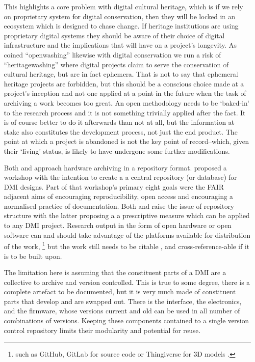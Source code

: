 This highlights a core problem with digital cultural heritage, which is if we rely on proprietary system for digital conservation, then they will be locked in an ecosystem which is designed to chase change. If heritage institutions are using proprietary digital systems \cite{innocente_framework_2023} they should be aware of their choice of digital infrastructure and the implications that will have on a project's longevity. As \textcite{bonvoisin_source_2017} coined ``openwashing'' likewise with digital conservation we run a risk of ``heritagewashing'' where digital projects claim to serve the conservation of cultural heritage, but are in fact ephemera. That is not to say that ephemeral heritage projects are forbidden, but this should be a conscious choice made at a project's inception and not one applied at a point in the future when the task of archiving a work becomes too great. An open methodology needs to be `baked-in' to the research process and it is not something trivially applied after the fact. It is of course better to do it afterwards than not at all, but the information at stake also constitutes the development process, not just the end product. The point at which a project is abandoned is not the key point of record--which, given their `living' status, is likely to have undergone some further modifications.

Both \textcite{mcpherson_nimehub_2016} and \textcite{fiordelmondo_towards_2025} approach hardware archiving in a repository format. \textcite{mcpherson_nimehub_2016} proposed a workshop with the intention to create a a central repository (or database) for DMI designs. Part of that workshop's primary eight goals were the FAIR adjacent aims of encouraging reproducibility, open access and encouraging a normalised practice of documentation. Both \textcite{mcpherson_nimehub_2016} and \cite{fiordelmondo_towards_2025} raise the issue of repository structure with the latter proposing a a prescriptive measure which can be applied to any DMI project. Research output in the form of open hardware or open software can and should take advantage of the platforms available for distribution of the work,
\footnote{such as GitHub, GitLab for source code or Thingiverse for 3D models \cite{oshwa_best_2013}.}
but the work still needs to be citable \cite{smith_software_2016}, and cross-reference-able \cite{stall_journal_2023} if it is to be built upon.

The limitation here is assuming that the constituent parts of a DMI are a collective to archive and version controlled. This is true to some degree, there is a complete artefact to be documented, but it is very much made of constituent parts that develop and are swapped out. There is the interface, the electronics, and the firmware, whose versions current and old can be used in all number of combinations of versions. Keeping these components contained to a single version control repository limits their modularity and potential for reuse.

